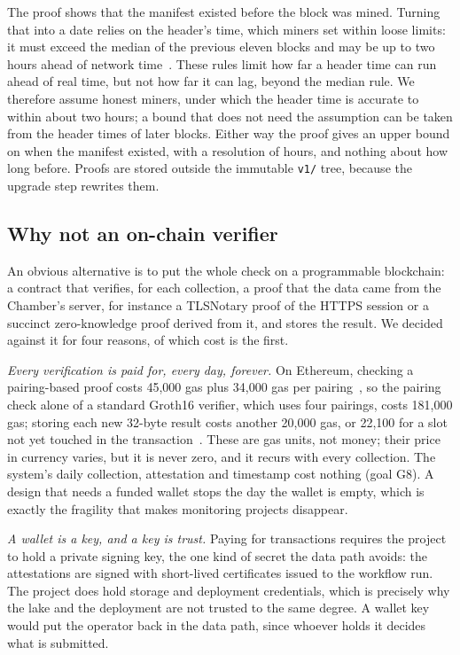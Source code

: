 The proof shows that the manifest existed before the block was mined. Turning that into a date relies on the header's time, which miners set within loose limits: it must exceed the median of the previous eleven blocks and may be up to two hours ahead of network time~\citep{bitcoin-devref-blockchain,szalachowski2018timestamps}. These rules limit how far a header time can run ahead of real time, but not how far it can lag, beyond the median rule. We therefore assume honest miners, under which the header time is accurate to within about two hours; a bound that does not need the assumption can be taken from the header times of later blocks. Either way the proof gives an upper bound on when the manifest existed, with a resolution of hours, and nothing about how long before. Proofs are stored outside the immutable \texttt{v1/} tree, because the upgrade step rewrites them.

\subsection{Why not an on-chain verifier}
\label{sec:onchain}

An obvious alternative is to put the whole check on a programmable blockchain: a contract that verifies, for each collection, a proof that the data came from the Chamber's server, for instance a TLSNotary proof of the HTTPS session or a succinct zero-knowledge proof derived from it, and stores the result. We decided against it for four reasons, of which cost is the first.

\emph{Every verification is paid for, every day, forever.} On Ethereum, checking a pairing-based proof costs 45,000 gas plus 34,000 gas per pairing~\citep{eip1108}, so the pairing check alone of a standard Groth16 verifier, which uses four pairings, costs 181,000 gas; storing each new 32-byte result costs another 20,000 gas, or 22,100 for a slot not yet touched in the transaction~\citep{eip2200,eip2929}. These are gas units, not money; their price in currency varies, but it is never zero, and it recurs with every collection. The system's daily collection, attestation and timestamp cost nothing (goal G8). A design that needs a funded wallet stops the day the wallet is empty, which is exactly the fragility that makes monitoring projects disappear.

\emph{A wallet is a key, and a key is trust.} Paying for transactions requires the project to hold a private signing key, the one kind of secret the data path avoids: the attestations are signed with short-lived certificates issued to the workflow run. The project does hold storage and deployment credentials, which is precisely why the lake and the deployment are not trusted to the same degree. A wallet key would put the operator back in the data path, since whoever holds it decides what is submitted.

